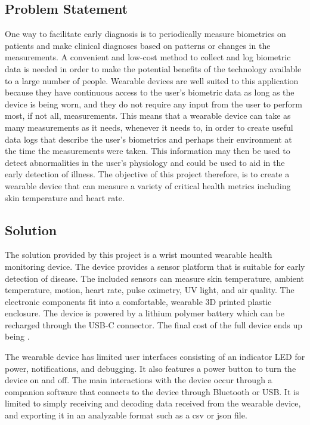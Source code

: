 \subsection{Problem Statement}

One way to facilitate early diagnosis is to periodically measure biometrics on 
patients and make clinical diagnoses based on patterns or changes in the 
measurements. A convenient and low-cost method to collect and log biometric data 
is needed in order to make the potential benefits of the technology available to 
a large number of people. Wearable devices are well suited to this application 
because they have continuous access to the user’s biometric data as long as the 
device is being worn, and they do not require any input from the user to perform 
most, if not all, measurements. This means that a wearable device can take as 
many measurements as it needs, whenever it needs to, in order to create useful 
data logs that describe the user’s biometrics and perhaps their environment at 
the time the measurements were taken.  This information may then be used to 
detect abnormalities in the user’s physiology and could be used to aid in the 
early detection of illness. The objective of this project therefore, is to 
create a wearable device that can measure a variety of critical health metrics 
including skin temperature and heart rate.

\subsection{Solution}

The solution provided by this project is a wrist mounted wearable health 
monitoring device. The device provides a sensor platform that is suitable for 
early detection of disease. The included sensors can measure skin temperature, 
ambient temperature, motion, heart rate, pulse oximetry, UV light, and air quality.  
The electronic components fit into a comfortable, wearable 3D printed plastic enclosure.
The device is powered by a lithium polymer battery which can be recharged
through the USB-C connector.  The final cost of the full device ends up being \costofboard.

The wearable device has limited user interfaces consisting of an indicator
LED for power, notifications, and debugging. It also features a power button
to turn the device on and off. The main interactions with the device occur 
through a companion software that connects to the device through Bluetooth or 
USB. It is limited to simply receiving and decoding data received from the 
wearable device, and exporting it in an analyzable format such as a csv or json 
file.

